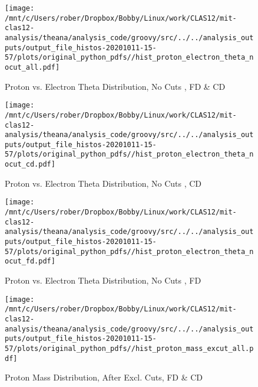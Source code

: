\documentclass{article}
\begin{document}
\begin{landscape}
    \begin{figure}[h]
        \centering

        \texttt{[image: /mnt/c/Users/rober/Dropbox/Bobby/Linux/work/CLAS12/mit-clas12-analysis/theana/analysis\_code/groovy/src/../../analysis\_outputs/output\_file\_histos-20201011-15-57/plots/original\_python\_pdfs//hist\_proton\_electron\_theta\_nocut\_all.pdf]}
        \captionsetup{textformat=empty,labelformat=blank}
        \caption{Proton vs. Electron Theta Distribution, No Cuts , FD \& CD}
    \end{figure}
    \clearpage
    
    \begin{figure}[h]
        \centering

        \texttt{[image: /mnt/c/Users/rober/Dropbox/Bobby/Linux/work/CLAS12/mit-clas12-analysis/theana/analysis\_code/groovy/src/../../analysis\_outputs/output\_file\_histos-20201011-15-57/plots/original\_python\_pdfs//hist\_proton\_electron\_theta\_nocut\_cd.pdf]}
        \captionsetup{textformat=empty,labelformat=blank}
        \caption{Proton vs. Electron Theta Distribution, No Cuts , CD}
    \end{figure}
    \clearpage
    
    \begin{figure}[h]
        \centering

        \texttt{[image: /mnt/c/Users/rober/Dropbox/Bobby/Linux/work/CLAS12/mit-clas12-analysis/theana/analysis\_code/groovy/src/../../analysis\_outputs/output\_file\_histos-20201011-15-57/plots/original\_python\_pdfs//hist\_proton\_electron\_theta\_nocut\_fd.pdf]}
        \captionsetup{textformat=empty,labelformat=blank}
        \caption{Proton vs. Electron Theta Distribution, No Cuts , FD}
    \end{figure}
    \clearpage
    
    \begin{figure}[h]
        \centering

        \texttt{[image: /mnt/c/Users/rober/Dropbox/Bobby/Linux/work/CLAS12/mit-clas12-analysis/theana/analysis\_code/groovy/src/../../analysis\_outputs/output\_file\_histos-20201011-15-57/plots/original\_python\_pdfs//hist\_proton\_mass\_excut\_all.pdf]}
        \captionsetup{textformat=empty,labelformat=blank}
        \caption{Proton Mass Distribution, After Excl. Cuts, FD \& CD}
    \end{figure}
    \clearpage
    
    \begin{figure}[h]
        \centering


\end{figure}
\end{landscape}
\end{document}

